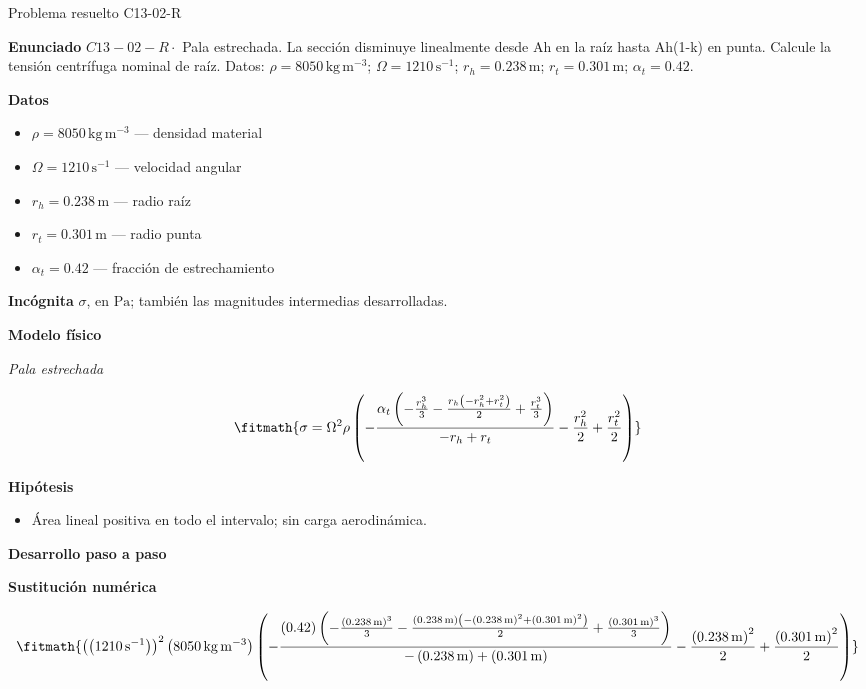 \documentclass[10pt,openany]{book}
\begin{document}
\begin{studiumworked}{Problema resuelto C13-02-R}


\noindent\textbf{Enunciado}
\(C13-02-R \cdot\) Pala estrechada. La sección disminuye linealmente desde Ah en la raíz hasta Ah(1-k) en punta. Calcule la tensión centrífuga nominal de raíz. Datos: \(\rho=8050\, \mathrm{kg}\,\mathrm{m}^{-3}\); \(\Omega=1210\, \mathrm{s}^{-1}\); \(r_h=0.238\, \mathrm{m}\); \(r_t=0.301\, \mathrm{m}\); \(\alpha_t=0.42\).

\noindent\textbf{Datos}
\begin{itemize}
\item $\rho = 8050\,\mathrm{kg}\,\mathrm{m}^{-3}$ — densidad material
\item $\Omega = 1210\,\mathrm{s}^{-1}$ — velocidad angular
\item $r_h = 0.238\,\mathrm{m}$ — radio raíz
\item $r_t = 0.301\,\mathrm{m}$ — radio punta
\item $\alpha_t = 0.42$ — fracción de estrechamiento
\end{itemize}

\noindent\textbf{Incógnita}
$\sigma$, en $\mathrm{Pa}$; también las magnitudes intermedias desarrolladas.

\noindent\textbf{Modelo físico}

\noindent\textit{Pala estrechada}

\[
\fitmath{\sigma=\Omega^{2} \rho \left(- \frac{\alpha_t \left(- \frac{r_h^{3}}{3} - \frac{r_h \left(- r_h^{2} + r_t^{2}\right)}{2} + \frac{r_t^{3}}{3}\right)}{- r_h + r_t} - \frac{r_h^{2}}{2} + \frac{r_t^{2}}{2}\right)}
\]

\noindent\textbf{Hipótesis}
\begin{itemize}
\item Área lineal positiva en todo el intervalo; sin carga aerodinámica.
\end{itemize}

\noindent\textbf{Desarrollo paso a paso}



\noindent\textbf{Sustitución numérica}

\[
\fitmath{\left(\left(1210\,\mathrm{s}^{-1}\right)\right)^{2} \left(8050\,\mathrm{kg}\,\mathrm{m}^{-3}\right) \left(- \frac{\left(0.42\right) \left(- \frac{\left(0.238\,\mathrm{m}\right)^{3}}{3} - \frac{\left(0.238\,\mathrm{m}\right) \left(- \left(0.238\,\mathrm{m}\right)^{2} + \left(0.301\,\mathrm{m}\right)^{2}\right)}{2} + \frac{\left(0.301\,\mathrm{m}\right)^{3}}{3}\right)}{- \left(0.238\,\mathrm{m}\right) + \left(0.301\,\mathrm{m}\right)} - \frac{\left(0.238\,\mathrm{m}\right)^{2}}{2} + \frac{\left(0.301\,\mathrm{m}\right)^{2}}{2}\right)}
\]


\end{studiumworked}
\end{document}
